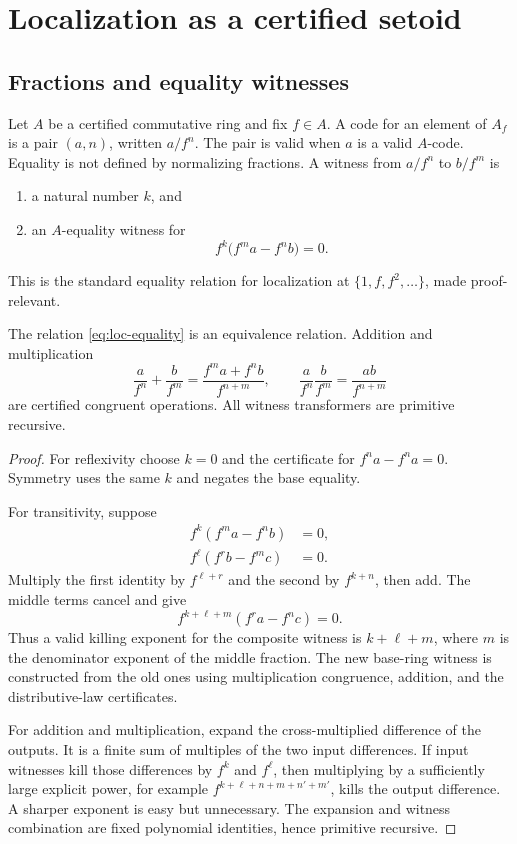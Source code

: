 \section{Localization as a certified setoid}

\subsection{Fractions and equality witnesses}

Let $A$ be a certified commutative ring and fix $f\in A$.  A code for an element of $A_f$ is a pair
$(a,n)$, written $a/f^n$.  The pair is valid when $a$ is a valid $A$-code.  Equality is not defined by
normalizing fractions.  A witness from $a/f^n$ to $b/f^m$ is
\begin{enumerate}[label=(\alph*)]
\item a natural number $k$, and
\item an $A$-equality witness for
\begin{equation}\label{eq:loc-equality}
             f^k\bigl(f^m a-f^n b\bigr)=0.
\end{equation}
\end{enumerate}
This is the standard equality relation for localization at
$\{1,f,f^2,\ldots\}$, made proof-relevant.

\begin{theorem}\label{thm:localization-calculus}
The relation \eqref{eq:loc-equality} is an equivalence relation.  Addition and multiplication
\[
 \frac a{f^n}+\frac b{f^m}
   =\frac{f^m a+f^n b}{f^{n+m}},\qquad
 \frac a{f^n}\frac b{f^m}=\frac{ab}{f^{n+m}}
\]
are certified congruent operations.  All witness transformers are primitive recursive.
\end{theorem}

\begin{proof}
For reflexivity choose $k=0$ and the certificate for $f^n a-f^n a=0$.  Symmetry uses the same
$k$ and negates the base equality.

For transitivity, suppose
\begin{align*}
 f^k(f^m a-f^n b)&=0,\\
 f^\ell(f^r b-f^m c)&=0.
\end{align*}
Multiply the first identity by $f^{\ell+r}$ and the second by $f^{k+n}$, then add.  The middle
terms cancel and give
\[
 f^{k+\ell+m}(f^r a-f^n c)=0.
\]
Thus a valid killing exponent for the composite witness is $k+\ell+m$, where $m$ is the
denominator exponent of the middle fraction.  The new base-ring witness is constructed from the old
ones using multiplication congruence, addition, and the distributive-law certificates.

For addition and multiplication, expand the cross-multiplied difference of the outputs.  It is a
finite sum of multiples of the two input differences.  If input witnesses kill those differences by
$f^k$ and $f^\ell$, then multiplying by a sufficiently large explicit power, for example
$f^{k+\ell+n+m+n'+m'}$, kills the output difference.  A sharper exponent is easy but unnecessary.
The expansion and witness combination are fixed polynomial identities, hence primitive recursive.
\end{proof}

